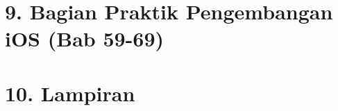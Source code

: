 \documentclass[11pt,a4paper,openany]{book}
\begin{document}
\part*{9. Bagian Praktik Pengembangan iOS (Bab 59-69)}











\appendix
\part*{10. Lampiran}









\end{document}
